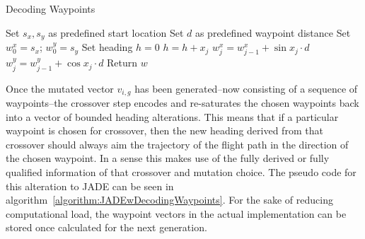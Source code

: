 \documentclass[10pt,a4paper, oneside, conference]{IEEEtran}
\begin{document}
	\begin{algorithm}[h]
  \caption{Decoding Waypoints}\label{algorithm:DecodingWaypoints}
  \begin{algorithmic}[1]
    \State Set $s_x,s_y$ as predefined start location
    \State Set $d$ as predefined waypoint distance
    \State Set $w^x_{0}=s_x$; $w^y_{0}=s_y$
    \State Set heading $h=0$
    \State $h=h+x_j$
    \State $w^x_j=w^x_{j-1}+\sin{x_j} \cdot d$
    \State $w^y_j=w^y_{j-1}+\cos{x_j} \cdot d$
    \EndFor
    \State Return {$w$}
    \EndProcedure
  \end{algorithmic}
\end{algorithm}
	
	Once the mutated vector $v_{i,g}$ has been generated--now consisting of a sequence of waypoints--the crossover step encodes and re-saturates the chosen waypoints back into a vector of bounded heading alterations.
	This means that if a particular waypoint is chosen for crossover, then the new heading derived from that crossover should  always aim the trajectory of the flight path in the direction of the chosen waypoint. In a sense this makes use of the fully derived or fully qualified information of that crossover and mutation choice.
	The pseudo code for this alteration to JADE can be seen in algorithm~\ref{algorithm:JADEwDecodingWaypoints}.
	For the sake of reducing computational load, the waypoint vectors in the actual implementation can be stored once calculated for the next generation.
	 
\end{document}
